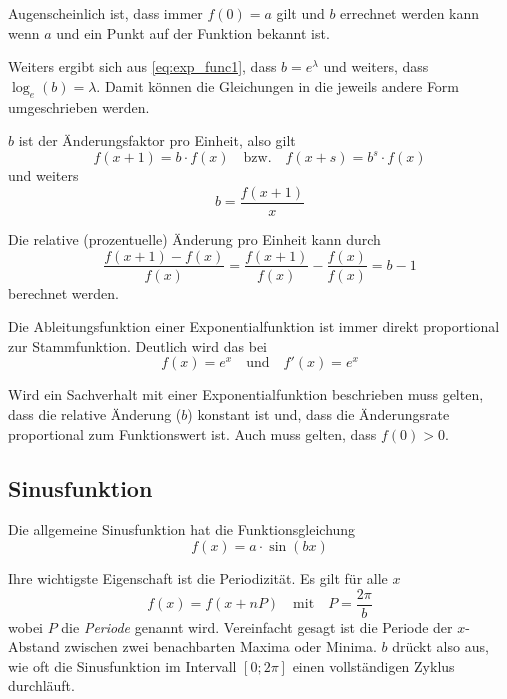 \documentclass[twocolumn]{article}
\newcommand{\term}[1]{\emph{#1}}
\begin{document}
Augenscheinlich ist, dass immer $f(0) = a$ gilt und $b$ errechnet werden kann wenn $a$ und ein Punkt auf der Funktion bekannt ist.

Weiters ergibt sich aus \eqref{eq:exp_func1}, dass $b = e^{\lambda}$ und weiters, dass $\log_e(b) = \lambda$. Damit können die Gleichungen in die jeweils andere Form umgeschrieben werden.

$b$ ist der Änderungsfaktor pro Einheit, also gilt
\begin{equation*}
    f(x + 1) = b \cdot f(x)\quad \mathrm{bzw.}\quad f(x + s) = b^s \cdot f(x)
\end{equation*}
und weiters
\begin{equation*}
    b = \frac{f(x + 1)}{x}
\end{equation*}

Die relative (prozentuelle) Änderung pro Einheit kann durch
\begin{equation*}
    \frac{f(x + 1) - f(x)}{f(x)} = \frac{f(x + 1)}{f(x)} - \frac{f(x)}{f(x)} = b - 1
\end{equation*}
berechnet werden.

Die Ableitungsfunktion einer Exponentialfunktion ist immer direkt proportional zur Stammfunktion. Deutlich wird das bei
\begin{equation*}
    f(x) = e^x\quad \mathrm{und}\quad f'(x) = e^x
\end{equation*}

Wird ein Sachverhalt mit einer Exponentialfunktion beschrieben muss gelten, dass die relative Änderung ($b$) konstant ist und, dass die Änderungsrate proportional zum Funktionswert ist. Auch muss gelten, dass $f(0) > 0$.

\subsection{Sinusfunktion}

Die allgemeine Sinusfunktion hat die Funktionsgleichung
\begin{equation*}
    f(x) = a \cdot \sin(bx)
\end{equation*}

Ihre wichtigste Eigenschaft ist die Periodizität. Es gilt für alle $x$
\begin{equation*}
    f(x) = f(x + nP)\quad \mathrm{mit}\quad P = \frac{2\pi}{b}
\end{equation*}
wobei $P$ die \term{Periode} genannt wird. Vereinfacht gesagt ist die Periode der $x$-Abstand zwischen zwei benachbarten Maxima oder Minima. $b$ drückt also aus, wie oft die Sinusfunktion im Intervall $[0; 2\pi]$ einen vollständigen Zyklus durchläuft.
\end{document}
